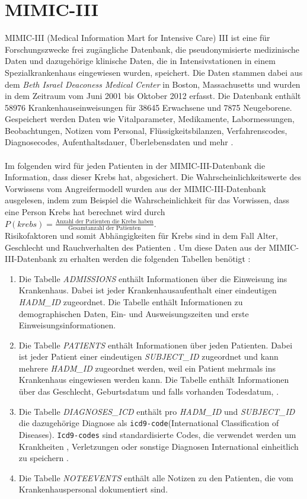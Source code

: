 \documentclass[german,version-2020-11]{uzl-thesis}
\begin{document}
\section{MIMIC-III}
MIMIC-III (Medical Information Mart for Intensive Care) III ist eine für Forschungszwecke frei zugängliche Datenbank, die pseudonymisierte medizinische Daten und dazugehörige klinische Daten, die in Intensivstationen in einem Spezialkrankenhaus eingewiesen wurden, speichert. Die Daten stammen dabei aus dem \textit{Beth Israel Deaconess Medical Center} in Boston, Massachusetts und wurden in dem Zeitraum vom Juni 2001 bis Oktober 2012 erfasst. Die Datenbank enthält 58976 Krankenhauseinweisungen für 38645 Erwachsene und 7875 Neugeborene. Gespeichert werden Daten wie Vitalparameter, Medikamente, Labormessungen, Beobachtungen, Notizen vom Personal, Flüssigkeitsbilanzen, Verfahrenscodes, Diagnosecodes, Aufenthaltsdauer, Überlebensdaten und mehr \cite{12}.  \\ \\ 
Im folgenden wird für jeden Patienten in der MIMIC-III-Datenbank die Information, dass dieser Krebs hat, abgesichert. Die Wahrscheinlichkeitswerte des Vorwissens vom Angreifermodell wurden aus der MIMIC-III-Datenbank ausgelesen, indem zum Beispiel die Wahrscheinlichkeit für das Vorwissen, dass eine Person Krebs hat berechnet wird durch $
P(krebs) =  \frac{\text{Anzahl der Patienten die Krebs haben}}{\text{Gesamtanzahl der Patienten}}$. \\ 
Risikofaktoren und somit Abhängigkeiten für Krebs sind in dem Fall Alter, Geschlecht und Rauchverhalten des Patienten \cite{13,14}. Um diese Daten aus der MIMIC-III-Datenbank zu erhalten werden die folgenden Tabellen benötigt : 
\begin{enumerate}
	\item Die Tabelle \textit{ADMISSIONS} enthält Informationen über die Einweisung ins Krankenhaus. Dabei ist jeder Krankenhausaufenthalt einer eindeutigen \textit{HADM\_ID} zugeordnet. Die Tabelle enthält Informationen zu demographischen Daten, Ein- und Ausweisungszeiten und erste Einweisungsinformationen.
	\item Die Tabelle \textit{PATIENTS} enthält Informationen über jeden Patienten. Dabei ist jeder Patient einer eindeutigen \textit{SUBJECT\_ID} zugeordnet und kann mehrere \textit{HADM\_ID} zugeordnet werden, weil ein Patient mehrmals ins Krankenhaus eingewiesen werden kann. Die Tabelle enthält Informationen über das Geschlecht, Geburtsdatum und falls vorhanden Todesdatum, .
	\item Die Tabelle \textit{DIAGNOSES\_ICD} enthält pro \textit{HADM\_ID} und \textit{SUBJECT\_ID} die dazugehörige Diagnose als \texttt{icd9-code}(International Classification of Diseases). \texttt{Icd9-codes} sind standardisierte Codes, die verwendet  werden um Krankheiten , Verletzungen oder sonstige Diagnosen International einheitlich zu speichern \cite{15}.
	\item Die Tabelle \textit{NOTEEVENTS} enthält alle Notizen zu den Patienten, die vom Krankenhauspersonal dokumentiert sind.
\end{enumerate} 
\end{document}
